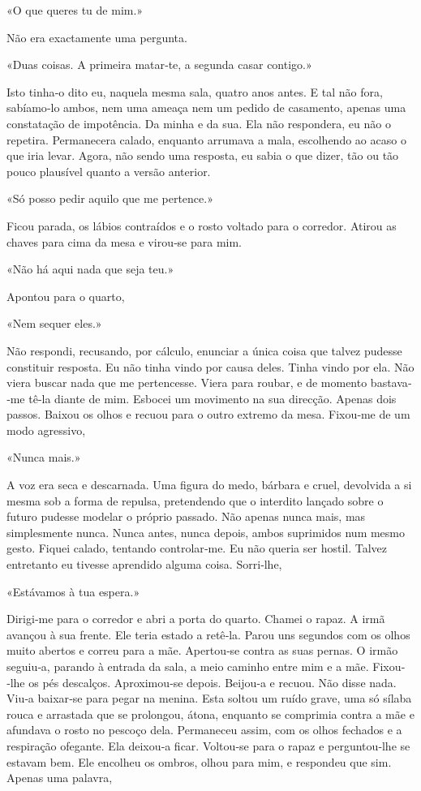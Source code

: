 «O que queres tu de mim.»

Não era exactamente uma pergunta.

«Duas coisas. A primeira matar­‑te, a segunda casar contigo.»

Isto tinha­‑o dito eu, naquela mesma sala, quatro anos antes. E tal não
fora, sabíamo­‑lo ambos, nem uma ameaça nem um pedido de casamento,
apenas uma constatação de impotência. Da minha e da sua. Ela não
respondera, eu não o repetira. Permanecera calado, enquanto arrumava a
mala, escolhendo ao acaso o que iria levar. Agora, não sendo uma
resposta, eu sabia o que dizer, tão ou tão pouco plausível quanto a
versão anterior.

«Só posso pedir aquilo que me pertence.»

Ficou parada, os lábios contraídos e o rosto voltado para o corredor.
Atirou as chaves para cima da mesa e virou­‑se para mim.

«Não há aqui nada que seja teu.»

Apontou para o quarto,

«Nem sequer eles.»

Não respondi, recusando, por cálculo, enunciar a única coisa que talvez
pudesse constituir resposta. Eu não tinha vindo por causa deles. Tinha
vindo por ela. Não viera buscar nada que me pertencesse. Viera para
roubar, e de momento bastava­‑me tê­‑la diante de mim. Esbocei um
movimento na sua direcção. Apenas dois passos. Baixou os olhos e recuou
para o outro extremo da mesa. Fixou­‑me de um modo agressivo,

«Nunca mais.»

A voz era seca e descarnada. Uma figura do medo, bárbara e cruel,
devolvida a si mesma sob a forma de repulsa, pretendendo que o interdito
lançado sobre o futuro pudesse modelar o próprio passado. Não apenas
nunca mais, mas simplesmente nunca. Nunca antes, nunca depois, ambos
suprimidos num mesmo gesto. Fiquei calado, tentando controlar­‑me. Eu
não queria ser hostil. Talvez entretanto eu tivesse aprendido alguma
coisa. Sorri­‑lhe,

«Estávamos à tua espera.»

Dirigi­‑me para o corredor e abri a porta do quarto. Chamei o rapaz. A
irmã avançou à sua frente. Ele teria estado a retê­‑la. Parou uns
segundos com os olhos muito abertos e correu para a mãe. Apertou­‑se
contra as suas pernas. O irmão seguiu­‑a, parando à entrada da sala, a
meio caminho entre mim e a mãe. Fixou­‑lhe os pés descalços.
Aproximou­‑se depois. Beijou­‑a e recuou. Não disse nada. Viu­‑a
baixar­‑se para pegar na menina. Esta soltou um ruído grave, uma só
sílaba rouca e arrastada que se prolongou, átona, enquanto se comprimia
contra a mãe e afundava o rosto no pescoço dela. Permaneceu assim, com
os olhos fechados e a respiração ofegante. Ela deixou­‑a ficar.
Voltou­‑se para o rapaz e perguntou­‑lhe se estavam bem. Ele encolheu os
ombros, olhou para mim, e respondeu que sim. Apenas uma palavra,

